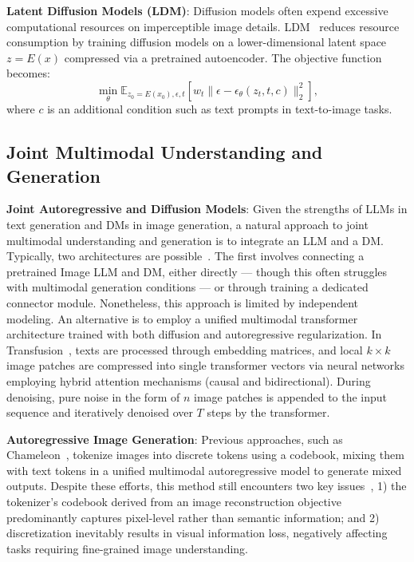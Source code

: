 \textbf{Latent Diffusion Models (LDM)}: Diffusion models often expend excessive computational resources
on imperceptible image details.
LDM~\cite{rombach2022high} reduces resource consumption by training diffusion models
on a lower-dimensional latent space $z = E(x)$ compressed via a pretrained autoencoder.
The objective function becomes:
\begin{equation}
    \min_\theta \mathbb{E}_{z_0 = E(x_0), \epsilon, t}[w_t \|\epsilon - \epsilon_\theta(z_t, t, c)\|_2^2],
    \label{eq:ldm-loss}
\end{equation}
where $c$ is an additional condition such as text prompts in text-to-image tasks.

\subsection{Joint Multimodal Understanding and Generation}\label{subsec:joint-multimodal}

\textbf{Joint Autoregressive and Diffusion Models}: Given the strengths of LLMs in text generation and DMs in image generation,
a natural approach to joint multimodal understanding and generation is to integrate an LLM and a DM\@.
Typically, two architectures are possible~\cite{chen2024multi}.
The first involves connecting a pretrained Image LLM and DM, either directly --- though this often struggles
with multimodal generation conditions --- or through training a dedicated connector module.
Nonetheless, this approach is limited by independent modeling.
An alternative is to employ a unified multimodal transformer architecture trained with
both diffusion and autoregressive regularization.
In Transfusion~\cite{zhou2024transfusion}, texts are processed through embedding matrices,
and local $k\times k$ image patches are compressed into single transformer vectors via neural networks employing
hybrid attention mechanisms (causal and bidirectional).
During denoising, pure noise in the form of $n$ image patches is appended to the input sequence
and iteratively denoised over $T$ steps by the transformer.

\textbf{Autoregressive Image Generation}: Previous approaches, such as Chameleon~\cite{team2024chameleon},
tokenize images into discrete tokens using a codebook, mixing them with text tokens in
a unified multimodal autoregressive model to generate mixed outputs.
Despite these efforts, this method still encounters two key issues~\cite{chen2024multi},
1) the tokenizer's codebook derived from an image reconstruction objective predominantly captures pixel-level
rather than semantic information;
and 2) discretization inevitably results in visual information loss,
negatively affecting tasks requiring fine-grained image understanding.

